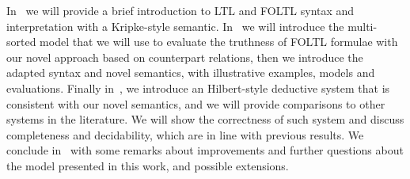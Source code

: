 In~ we will provide a brief introduction to \ac{LTL} and \ac{FOLTL} syntax and interpretation with a
Kripke-style semantic. In~ we will introduce the multi-sorted model that we will use to evaluate
the truthness of \ac{FOLTL} formulae with our novel approach based on counterpart relations, then we introduce the
adapted syntax and novel semantics, with illustrative examples, models and evaluations. Finally in~,
we introduce an Hilbert-style deductive system that is consistent with our novel semantics, and we will provide
comparisons to other systems in the literature. We will show the correctness of such system and discuss completeness and
decidability, which are in line with previous results. We conclude in~ with some remarks about
improvements and further questions about the model presented in this work, and possible extensions.
